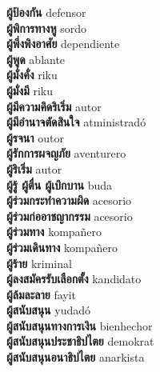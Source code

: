 \textbf{ ผู้ป้องกัน  } defensor \\
\textbf{ ผู้พิการทางหู  } sordo \\
\textbf{ ผู้พึ่งพิงอาศัย  } dependiente \\
\textbf{ ผู้พูด  } ablante \\
\textbf{ ผู้มั่งคั่ง  } riku \\
\textbf{ ผู้มั่งมี  } riku \\
\textbf{ ผู้มีความคิดริเริ่ม  } autor \\
\textbf{ ผู้มีอำนาจตัดสินใจ  } atministradó \\
\textbf{ ผู้รจนา  } outor \\
\textbf{ ผู้รักการผจญภัย  } aventurero \\
\textbf{ ผู้ริเริ่ม  } autor \\
\textbf{ ผู้รู้ ผู้ตื่น ผู้เบิกบาน  } buda \\
\textbf{ ผู้ร่วมกระทำความผิด  } acesorio \\
\textbf{ ผู้ร่วมก่ออาชญากรรม  } acesorio \\
\textbf{ ผู้ร่วมทาง  } kompañero \\
\textbf{ ผู้ร่วมเดินทาง  } kompañero \\
\textbf{ ผู้ร้าย  } kriminal \\
\textbf{ ผู้ลงสมัครรับเลือกตั้ง  } kandidato \\
\textbf{ ผู้ล้มละลาย  } fayit \\
\textbf{ ผู้สนับสนุน  } yudadó \\
\textbf{ ผู้สนับสนุนทางการเงิน  } bienhechor \\
\textbf{ ผู้สนับสนุนประชาธิปไตย  } demokrat \\
\textbf{ ผู้สนับสนุนอนาธิปไตย  } anarkista \\
